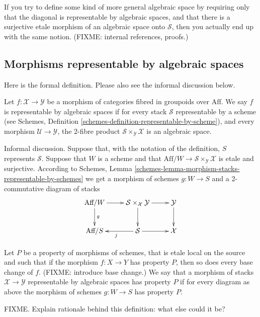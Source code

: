 \begin{remark}
\label{remark-definition-correct}
If you try to define some kind of more general algebraic space by requiring
only that the diagonal is representable by algebraic spaces, and that there is
a surjective etale morphism of an algebraic space onto $\mathcal{S}$, then 
you actually end up with the same notion.
(FIXME: internal references, proofs.)
\end{remark}

\subsection{Morphisms representable by algebraic spaces}
\label{subsection-morphism-representable-by-algebraic-spaces}

\noindent
Here is the formal definition. Please also see the informal discussion below.

\begin{definition}
\label{definition-representable-by-algebraic-spaces}
Let $f : \mathcal{X} \to \mathcal{Y}$ be a morphism of categories
fibred in groupoids over $\text{Aff}$. We say $f$ is representable by
algebraic spaces if for every stack $\mathcal{S}$ representable by a scheme
(see Schemes, Definition \ref{schemes-definition-representable-by-scheme}),
and every morphism $\mathcal{U} \to \mathcal{Y}$, the 2-fibre product
$\mathcal{S}\times_\mathcal{Y}\mathcal{X}$ is an algebraic space.
\end{definition}

\noindent
Informal discussion. Suppose that, with the notation of the definition,
$S$ represents $\mathcal{S}$. Suppose that $W$ is a scheme and that
$\text{Aff}/W \to \mathcal{S}\times_\mathcal{Y}\mathcal{X}$ is 
etale and surjective. According to
Schemes, Lemma \ref{schemes-lemma-morphism-stacks-representable-by-schemes}
we get a morphism of schemes $g : W \to S$ and a 2-commutative diagram
of stacks
$$
\xymatrix{
\text{Aff}/W \ar[d]^g \ar[r] &
\mathcal{S}\times_\mathcal{X}\mathcal{Y} \ar[d] \ar[r] &
\mathcal{Y} \ar[d] \\
\text{Aff}/S &
\mathcal{S} \ar[l]^j \ar[r] & \mathcal{X}
}
$$

\begin{definition}
\label{definition-property-morphism-representable-by-algebraic-spaces}
Let $P$ be a property of morphisms of schemes, that is etale local
on the source and such that if the morphism $f : X \to Y$ has property $P$,
then so does every base change of $f$. (FIXME: introduce base change.)
We say that a morphism of stacks $\mathcal{X}
\to \mathcal{Y}$ representable by algebraic spaces has property
$P$ if for every diagram as above the morphism of schemes
$g : W \to S$ has property $P$.
\end{definition}

\noindent
FIXME. Explain rationale behind this definition: what else could it be?







